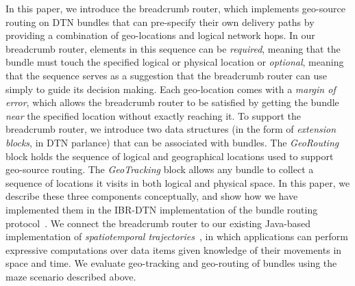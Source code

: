 In this paper, we introduce the {\sc breadcrumb} router, which implements geo-source routing on DTN bundles that can pre-specify their own delivery paths by providing a combination of geo-locations and logical network hops. In our {\sc breadcrumb} router, elements in this sequence can be {\em required}, meaning that the bundle must touch the specified logical or physical location or {\em optional}, meaning that the sequence serves as a suggestion that the {\sc breadcrumb} router can use simply to guide its decision making. Each geo-location comes with a {\em margin of error}, which allows the {\sc breadcrumb} router to be satisfied by getting the bundle {\em near} the specified location without exactly reaching it. To support the {\sc breadcrumb} router, we introduce two data structures (in the form of {\em extension blocks}, in DTN parlance) that can be associated with bundles. The {\em GeoRouting} block holds the sequence of logical and geographical locations used to support geo-source routing. The {\em GeoTracking} block allows any bundle to collect a sequence of locations it visits in both logical and physical space. In this paper, we describe these three components conceptually, and show how we have implemented them in the IBR-DTN implementation of the bundle routing protocol~\cite{IBR-DTN-WASA}. We connect the {\sc breadcrumb} router to our existing Java-based implementation of {\em spatiotemporal trajectories}~\cite{michel12:spatiotemporal}, in which applications can perform expressive computations over data items given knowledge of their movements in space and time. We evaluate geo-tracking and geo-routing of bundles using the maze scenario described above.





